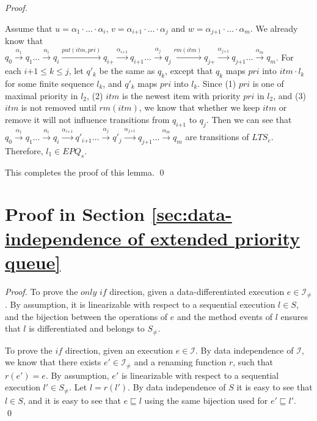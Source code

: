 \begin {proof}
\begin{itemize}
    Assume that $u = \alpha_1 \cdot \ldots \cdot \alpha_i$, $v = \alpha_{\textit{i+1}} \cdot \ldots \cdot \alpha_j$ and $w = \alpha_{\textit{j+1}} \cdot \ldots \cdot \alpha_m$. We already know that $q_0 \xrightarrow{\alpha_1} q_1 \ldots \xrightarrow{\alpha_i} q_i \xrightarrow{\textit{put}(\textit{itm},\textit{pri})} q_{\textit{i+}} \xrightarrow{\alpha_{\textit{i+1}}} q_{\textit{i+1}} \ldots \xrightarrow{\alpha_j} q_j \xrightarrow{\textit{rm}(\textit{itm})} q_{\textit{j+}} \xrightarrow{\alpha_{\textit{j+1}}} q_{\textit{j+1}} \ldots \xrightarrow{\alpha_m} q_m$. For each $\textit{i+1} \leq k \leq j$, let $q'_k$ be the same as $q_k$, except that $q_k$ maps $\textit{pri}$ into $\textit{itm} \cdot l_k$ for some finite sequence $l_k$, and $q'_k$ maps $\textit{pri}$ into $l_k$. Since (1) $\textit{pri}$ is one of maximal priority in $l_2$, (2) $\textit{itm}$ is the newest item with priority $\textit{pri}$ in $l_2$, and (3) $\textit{itm}$ is not removed until $\textit{rm}(\textit{itm})$, we know that whether we keep $\textit{itm}$ or remove it will not influence transitions from $q_{\textit{i+1}}$ to $q_j$. Then we can see that $q_0 \xrightarrow{\alpha_1} q_1 \ldots \xrightarrow{\alpha_i} q_i \xrightarrow{\alpha_{\textit{i+1}}} q'_{\textit{i+1}} \ldots \xrightarrow{\alpha_j} q'_j \xrightarrow{\alpha_{\textit{j+1}}} q_{\textit{j+1}} \ldots \xrightarrow{\alpha_m} q_m$ are transitions of $\textit{LTS}_e$. Therefore, $l_1 \in \textit{EPQ}_s$.
\end{itemize}

This completes the proof of this lemma. \qed
\end {proof}




\section{Proof in Section \ref{sec:data-independence of extended priority queue}}
\label{sec:appendix in section data-independence of EPQ}


\DataDifferentiatedisEnoughforPQ*

\begin {proof}

To prove the $\textit{only if}$ direction, given a data-differentiated execution $e \in \mathcal{I}_{\neq}$. By assumption, it is linearizable with respect to a sequential execution $l \in S$, and the bijection between the operations of $e$ and the method events of $l$ ensures that $l$ is differentiated and belongs to $S_{\neq}$.

To prove the $\textit{if}$ direction, given an execution $e \in \mathcal{I}$. By data independence of $\mathcal{I}$, we know that there exists $e' \in \mathcal{I}_{\neq}$ and a renaming function $r$, such that $r(e') = e$. By assumption, $e'$ is linearizable with respect to a sequential execution $l' \in S_{\neq}$. Let $l=r(l')$. By data independence of $S$ it is easy to see that $l \in S$, and it is easy to see that $e \sqsubseteq l$  using the same bijection used for $e' \sqsubseteq l'$. \qed
\end {proof}





